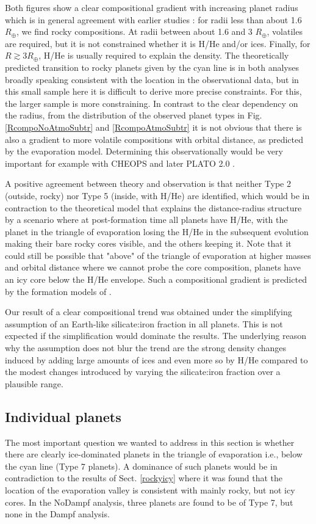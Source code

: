\documentclass[]{emulateapj}
\def\rearth{R_{\oplus}}
\begin{document}
Both figures show a clear compositional gradient with increasing planet radius which is in general agreement with earlier studies \citep[e.g.,][]{Marcy2014,Rogers2015,WolfgangLopez2015}: for radii less than about 1.6 $\rearth$, we find rocky compositions. At radii between about 1.6 and 3 $\rearth$, volatiles are required, but it is not constrained whether it is H/He and/or ices. Finally, for  $R\gtrsim 3 \rearth$, H/He is usually required to explain the density. The theoretically predicted transition to rocky planets given by the cyan line is in both analyses broadly speaking consistent with the location in the observational data, but in this small sample here it is difficult to derive more precise constraints. For this, the larger \citet{Fulton2017} sample is more constraining. In contrast to the clear dependency on the radius, from the distribution of the observed planet types in Fig. \ref{RcompoNoAtmoSubtr} and \ref{RcompoAtmoSubtr} it is not obvious that there is also a gradient to more volatile compositions with orbital distance, as predicted by the evaporation model. Determining this observationally would be very important for example with CHEOPS \citep{Broeg2013} and later PLATO 2.0 \citep{Rauer2013}.

A positive agreement between theory and observation is that neither Type 2 (outside, rocky) nor  Type 5 (inside, with H/He) are identified, which would be in contraction to the theoretical model that explains the distance-radius structure by a scenario where at post-formation time all planets have H/He, with the planet in the triangle of evaporation losing the H/He in the subsequent evolution making their bare rocky cores visible, and the others keeping it. Note that it could still be possible that "above" of the triangle of evaporation at higher masses and orbital distance where we cannot probe the core composition, planets have an icy core below the H/He envelope. Such a compositional gradient is  predicted by the formation models of \citet{Alibert2013}.

Our result of a clear compositional trend was obtained under the simplifying assumption of an Earth-like silicate:iron fraction in all planets. This is not expected if the simplification would dominate the results. The underlying reason why the assumption does not blur the trend are the strong density changes induced by adding large amounts of ices and even more so by H/He compared to the modest changes introduced by varying the  silicate:iron fraction over a plausible range.

\subsection{{Individual planets}}
The most important question we wanted to address in this section is whether there are clearly ice-dominated planets in the triangle of evaporation i.e., below the cyan line (Type 7 planets). A dominance of such planets would be in contradiction to the results of Sect. \ref{rockyicy} where it was found that the location of the evaporation valley is consistent with mainly rocky, but not icy cores.  In the NoDampf analysis, three planets are found to be of Type 7, but none in the Dampf analysis.
\end{document}
